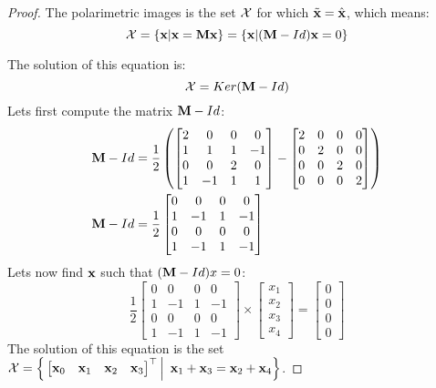 \begin{proof}
	The polarimetric images is the set $\mathcal{X}$ for which $\tilde{\textbf{x}} = \hat{\textbf{x}}$, which means:
	$$
	\setX = \{\vx | \vx = \mm\vx\} = \{\vx | (\mm - Id)\vx = 0\}
	$$
	
	The solution of this equation is:
	$$
	\setX = Ker(\mm - Id)
	$$
	Lets first compute the matrix $\mm-Id$:
	\begin{equation*}
		\begin{split}
			\mm - Id & = \frac{1}{2} \left( 
			\begin{bmatrix}
				2 & 0 & 0 & 0 \\
				1 & 1 & 1 & -1 \\
				0 & 0 & 2 & 0 \\
				1 & -1 & 1 & 1
			\end{bmatrix} -
			\begin{bmatrix}
				2 & 0 & 0 & 0 \\
				0 & 2 & 0 & 0 \\
				0 & 0 & 2 & 0 \\
				0 & 0 & 0 & 2
			\end{bmatrix}
			\right)
			\\
			\mm - Id & = \frac{1}{2}\begin{bmatrix}
				0 & 0 & 0 & 0 \\
				1 & -1 & 1 & -1 \\
				0 & 0 & 0 & 0 \\
				1 & -1 & 1 & -1
			\end{bmatrix}
		\end{split}
	\end{equation*}
	Lets now find $\textbf{x}$ such that $(\mm - Id)x = 0$:
	$$
	\frac{1}{2}\begin{bmatrix}
		0 & 0 & 0 & 0 \\
		1 & -1 & 1 & -1 \\
		0 & 0 & 0 & 0 \\
		1 & -1 & 1 & -1
	\end{bmatrix} 
	\times
	\begin{bmatrix}
		x_1 \\
		x_2 \\
		x_3 \\
		x_4
	\end{bmatrix} = 
	\begin{bmatrix}
		0 \\
		0 \\
		0 \\
		0
	\end{bmatrix}
	$$
	The solution of this equation is the set $\mathcal{X} = \Big\{\begin{bmatrix}	\textbf{x}_0 & \textbf{x}_1 & \textbf{x}_2 & \textbf{x}_3 \end{bmatrix}^\top \Big|\enspace \textbf{x}_1 + \textbf{x}_3 = \textbf{x}_2 + \textbf{x}_4\Big\}$.
\end{proof}